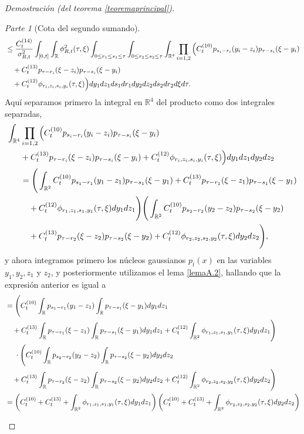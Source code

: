 \documentclass[letterpaper,twoside,12pt]{book}
\newcommand{\R}{\mathbb{R}}
\newcommand{\1}{\mathds{1}}
\theoremstyle{definition}
\theoremstyle{definition}
\theoremstyle{remark}
\newtheorem{proofpart}{Parte}
\theoremstyle{definition}
\theoremstyle{definition}
\theoremstyle{definition}
\theoremstyle{definition}
\theoremstyle{definition}
\begin{document}
\begin{proof}[Demostración (del teorema \ref{teoremaprincipal})]
\begin{proofpart}[Cota del segundo sumando]
\begin{align}
   &\leq \frac{C_t^{(14)}}{\sigma_{R,t}^2}\int_{[0,t]}\int_\R\phi_{R,t}^2(\tau,\xi)\int_{0\leq r_1\leq s_1\leq \tau}\int_{0\leq r_2\leq s_2\leq \tau}\int_{\R^4}\prod_{i=1,2}\Big(C^{(10)}_tp_{s_i-r_i}(y_i-z_i)p_{\tau-s_i}(\xi-y_i)\notag\\
   &\ \ \ +C_t^{(13)}p_{\tau-r_i}(\xi-z_i)p_{\tau-s_i}(\xi-y_i)\notag\\
   &\ \ \ +C_t^{(12)}\phi_{r_i,z_i,s_i,y_i}(\tau,\xi)\Big)  dy_1dz_1ds_1dr_1dy_2dz_2ds_2dr_2d\xi d\tau.\label{pruebacotaphi1}
\end{align}
Aquí separamos primero la integral en $\R^4$ del producto como dos integrales separadas, 
\begin{align}
   \int_{\R^{4}}&\prod_{i=1,2}\Big(C^{(10)}_tp_{s_i-r_i}(y_i-z_i)p_{\tau-s_i}(\xi-y_i)\notag\\
   &+C_t^{(13)}p_{\tau-r_i}(\xi-z_i)p_{\tau-s_i}(\xi-y_i)+C_t^{(12)}\phi_{r_i,z_i,s_i,y_i}(\tau,\xi)\Big)  dy_1dz_1dy_2dz_2\notag\\
   &=\Bigg(\int_{\R^{2}}C^{(10)}_tp_{s_1-r_1}(y_1-z_1)p_{\tau-s_1}(\xi-y_1)+C_t^{(13)}p_{\tau-r_1}(\xi-z_1)p_{\tau-s_1}(\xi-y_1)\notag\\
   &\ \ \ +C_t^{(12)}\phi_{r_1,z_1,s_1,y_1}(\tau,\xi)dy_1dz_1\Bigg) \Bigg(\int_{\R^{2}}C^{(10)}_tp_{s_2-r_2}(y_2-z_2)p_{\tau-s_2}(\xi-y_2)\notag\\
   &\ \ \ +C_t^{(13)}p_{\tau-r_2}(\xi-z_2)p_{\tau-s_2}(\xi-y_2)+C_t^{(12)}\phi_{r_2,z_2,s_2,y_2}(\tau,\xi)dy_2dz_2\Bigg),\notag
\end{align}
y ahora integramos primero los núcleos gaussianos $p_t(x)$ en las variables $y_1,y_2,z_1$ y $z_2$, y posteriormente utilizamos el lema \ref{lemaA.2}, hallando que la expresión anterior es igual a
\begin{align}
   &=\Bigg(C^{(10)}_t\int_{\R}p_{s_1-r_1}(y_1-z_1)\int_{\R}p_{\tau-s_1}(\xi-y_1)dy_1dz_1\notag\\
   &\ \ \ +C_t^{(13)}\int_{\R}p_{\tau-r_1}(\xi-z_1)\int_{\R}p_{\tau-s_1}(\xi-y_1)dy_1dz_1+C_t^{(12)}\int_{\R^2}\phi_{r_1,z_1,s_1,y_1}(\tau,\xi)dy_1dz_1\Bigg)\notag\\
   &\ \ \ \ \cdot\Bigg(C^{(10)}_t\int_{\R}p_{s_2-r_2}(y_2-z_2)\int_{\R}p_{\tau-s_2}(\xi-y_2)dy_2dz_2\notag\\
   &\ \ \ +C_t^{(13)}\int_{\R}p_{\tau-r_2}(\xi-z_2)\int_{\R}p_{\tau-s_2}(\xi-y_2)dy_2dz_2+C_t^{(12)}\int_{\R^2}\phi_{r_2,z_2,s_2,y_2}(\tau,\xi)dy_2dz_2\Bigg)\notag\\
   &=\left(C_t^{(10)}+C_t^{(13)}+\int_{\R^2}\phi_{r_1,z_1,s_1,y_1}(\tau,\xi)dy_1dz_1\right)\left(C_t^{(10)}+C_t^{(13)}+\int_{\R^2}\phi_{r_2,z_2,s_2,y_2}(\tau,\xi)dy_2dz_2\right)\notag\\

\end{align}
\end{proofpart}
\end{proof}
\end{document}
